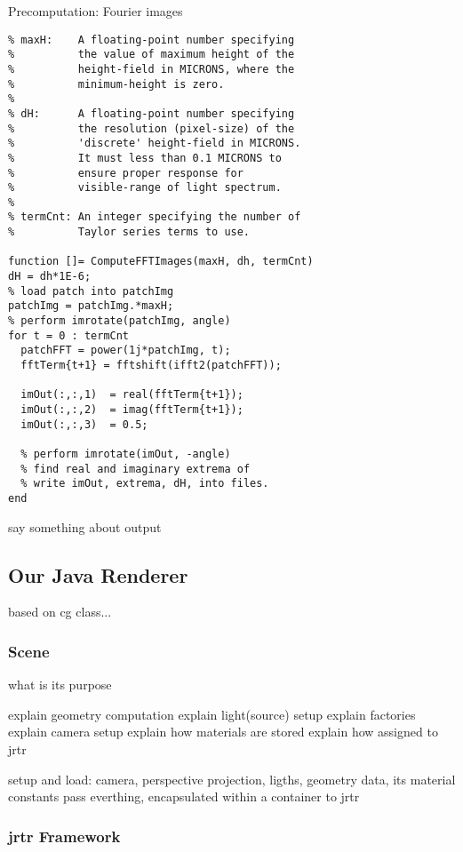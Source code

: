 \begin{algorithm}
\caption{Precomputation: Fourier images}
\begin{lstlisting}
% maxH:    A floating-point number specifying 
%          the value of maximum height of the 
%          height-field in MICRONS, where the 
%          minimum-height is zero. 
%         
% dH:      A floating-point number specifying 
%          the resolution (pixel-size) of the 
%          'discrete' height-field in MICRONS. 
%          It must less than 0.1 MICRONS to 
%          ensure proper response for 
%          visible-range of light spectrum.
%
% termCnt: An integer specifying the number of 
%          Taylor series terms to use.

function []= ComputeFFTImages(maxH, dh, termCnt)
dH = dh*1E-6;
% load patch into patchImg
patchImg = patchImg.*maxH;
% perform imrotate(patchImg, angle)
for t = 0 : termCnt
  patchFFT = power(1j*patchImg, t);
  fftTerm{t+1} = fftshift(ifft2(patchFFT));
  
  imOut(:,:,1)  = real(fftTerm{t+1});
  imOut(:,:,2)  = imag(fftTerm{t+1});
  imOut(:,:,3)  = 0.5;
  
  % perform imrotate(imOut, -angle)
  % find real and imaginary extrema of 
  % write imOut, extrema, dH, into files.
end
\end{lstlisting}
\end{algorithm}

say something about output

\subsection{Our Java Renderer}
based on cg class...

\subsubsection{Scene}

what is its purpose


explain geometry computation
explain light(source) setup
explain factories
explain camera setup
explain how materials are stored
explain how assigned to jrtr

setup and load: camera, perspective projection, ligths, geometry data, its material constants
pass everthing, encapsulated within a container to jrtr


\subsubsection{jrtr Framework}

